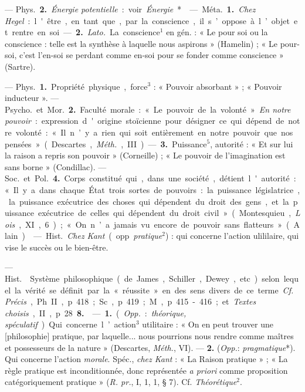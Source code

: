 \begin{itemize}[leftmargin=1cm, label=, itemsep=1pt]
— \si{Phys.} {\bf 2.} {\it Énergie potentielle} : voir {\it Énergie}*.

 — \si{Méta.} {\bf 1.} {\it Chez Hegel} : l'être, en tant que,
par la conscience, il s’oppose à l’objet et rentre en soi. —  {\bf 2.}
{\it Lato.} La conscience$^1$ en gén. : « Le pour soi ou la conscience :
telle est la synthèse à laquelle nous aspirons » (Hamelin) ; « Le pour-soi,
c’est l’en-soi se perdant comme en-soi pour se fonder comme conscience
» (Sartre).

 — \si{Phys.} {\bf 1.} Propriété physique, force$^3$ : « Pouvoir
absorbant » ; « Pouvoir inducteur ». — \si{Psycho.} et \si{Mor.} {\bf 2.}
Faculté morale : « Le pouvoir de la volonté ». {\it En notre pouvoir} :
expression d'origine stoïcienne pour désigner ce qui dépend de notre
volonté : « Il n’y a rien qui soit entièrement en notre pouvoir que nos
pensées » (Descartes, {\it Méth.}, III). — {\bf 3.} Puissance$^5$, autorité :
« Et sur lui la raison a repris son pouvoir » (Corneille) ; « Le pouvoir de
l'imagination est sans borne » (Condillac). — \si{Soc.} et \si{Pol.}
{\bf 4.} Corps constitué qui, dans une société, détient l'autorité : « Il y a
dans chaque État trois sortes de pouvoirs : la puissance législatrice, la
puissance exécutrice des choses qui dépendent du droit des gens, et la
puissance exécutrice de celles qui dépendent du droit civil » (Montesquieu,
{\it Lois}, XI, 6) ; « On n’a jamais vu encore de pouvoir sans flatteurs
» (Alain).

 — \si{Hist.} {\it Chez Kant} (opp. {\it pratique}$^2$) : qui
concerne l'action ulililaire, qui vise le succès ou le bien-être.

 — \si{Hist.}  Système philosophique (de
James, Schiller, Dewey, etc.) selon lequel la vérité se définit par la «
réussite » en des sens divers de ce terme. {\it Cf.} {\it Précis}, Ph. II, p.
418; Sc., p. 419; M., p. 415-416; et {\it Textes choisis}, II, p. 28 {\bf 8.}

 — {\bf 1.} ({\it Opp.} : {\it théorique, spéculatif}).
Qui concerne l’action$^3$ utilitaire : « On en peut trouver une [philosophie]
pratique, par laquelle... nous pourrions nous rendre comme maîtres et
possesseurs de la nature » (Descartes, {\it Méth.}, VI). — {\bf 2.}
({\it Opp.}: {\it pragmatique}*). Qui concerne l’action
{\it morale}. Spéc., {\it chez Kant} : « La Raison pratique » ; « La règle
pratique est inconditionnée, donc représentée {\it a priori} comme
proposition catégoriquement pratique » ({\it R. pr.}, I, 1, 1, § 7). Cf.
{\it Théorétique}$^2$.


\end{itemize}
